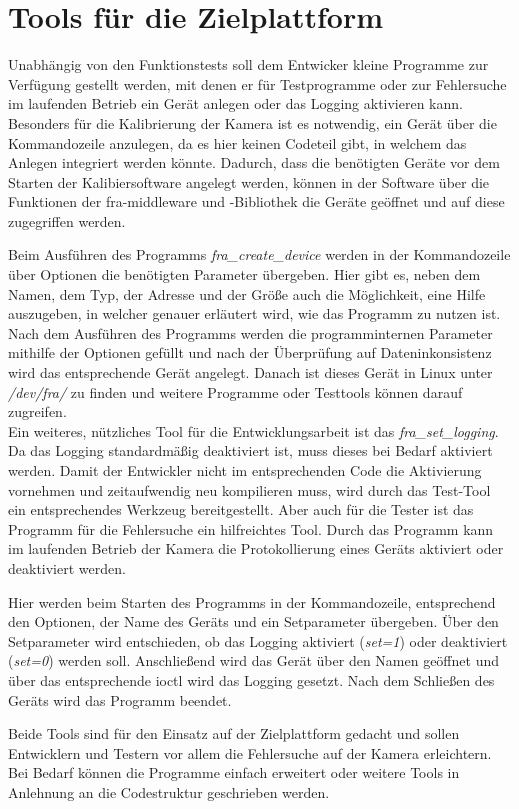 \section{Tools für die Zielplattform}
Unabhängig von den Funktionstests soll dem Entwicker kleine Programme zur Verfügung gestellt werden, mit denen er für Testprogramme oder zur Fehlersuche im laufenden Betrieb ein Gerät anlegen oder das Logging aktivieren kann. \\


Besonders für die Kalibrierung der Kamera ist es notwendig, ein Gerät über die Kommandozeile anzulegen, da es hier keinen Codeteil gibt, in welchem das Anlegen integriert werden könnte. Dadurch, dass die benötigten Geräte vor dem Starten der Kalibiersoftware angelegt werden, können in der Software über die Funktionen der \ac{fra}-\gls{middleware} und -Bibliothek die Geräte geöffnet und auf diese zugegriffen werden.


Beim Ausführen des Programms \textit{fra\_create\_device} werden in der Kommandozeile über Optionen die benötigten Parameter übergeben. Hier gibt es, neben dem Namen, dem Typ, der Adresse und der Größe auch die Möglichkeit, eine Hilfe auszugeben, in welcher genauer erläutert wird, wie das Programm zu nutzen ist. 
Nach dem Ausführen des Programms werden die programminternen Parameter mithilfe der Optionen gefüllt und nach der Überprüfung auf Dateninkonsistenz wird das entsprechende Gerät angelegt. 
Danach ist dieses Gerät in Linux unter \textit{/dev/fra/} zu finden und weitere Programme oder Testtools können darauf zugreifen.\\

Ein weiteres, nützliches Tool für die Entwicklungsarbeit ist das \textit{fra\_set\_logging}. Da das Logging standardmäßig deaktiviert ist, muss dieses bei Bedarf aktiviert werden. Damit der Entwickler nicht im entsprechenden Code die Aktivierung vornehmen und zeitaufwendig neu kompilieren muss, wird durch das Test-Tool ein entsprechendes Werkzeug bereitgestellt. Aber auch für die Tester ist das Programm für die Fehlersuche ein hilfreichtes Tool. Durch das Programm kann im laufenden Betrieb der Kamera die Protokollierung eines Geräts aktiviert oder deaktiviert werden.

Hier werden beim Starten des Programms in der Kommandozeile, entsprechend den Optionen, der Name des Geräts und ein Setparameter übergeben. 
Über den Setparameter wird entschieden, ob das Logging aktiviert (\textit{set=1}) oder deaktiviert (\textit{set=0}) werden soll. Anschließend wird das Gerät über den Namen geöffnet und über das entsprechende \ac{ioctl} wird das Logging gesetzt. Nach dem Schließen des Geräts wird das Programm beendet. 


Beide Tools sind für den Einsatz auf der Zielplattform gedacht und sollen Entwicklern und Testern vor allem die Fehlersuche auf der Kamera erleichtern. Bei Bedarf können die Programme einfach erweitert oder weitere Tools in Anlehnung an die Codestruktur geschrieben werden. 